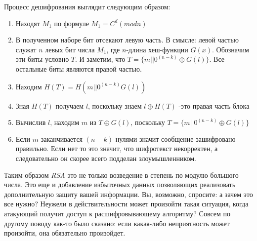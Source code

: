   Процесс дешифрования выглядит следующим образом:
    \begin{enumerate}
	    \item Находят {$M_1$} по формуле \textit{$ M_{1}=C^{d}(mod n) $}
	    \item В полученном наборе бит отсекают левую часть. В смысле: левой частью служат {$n$} левых бит числа {$M_1$}, где {$n$}-длина 
	      хеш-функции {$G(x)$}. Обозначим эти биты условно {$T$}. И заметим, что {$T= \{m||0^{(n-k)} \oplus G(l)\} $}. Все 
	      остальные биты являются правой частью.
	    \item Находим {$ H(T)=H(m||0^{(n-k)} G(l)) $}
	    \item Зная {$H(T)$} получаем {$l$}, поскольку знаем {$l \oplus H(T)$} -это правая часть блока
	    \item Вычислив {$l$}, находим {$m$} из {$T \oplus G(l)$}, поскольку {$ T=\{m||0^{(n-k)} \oplus G(l)\} $}
	    \item Если {$m$} заканчивается {$(n-k)$}-нулями значит сообщение зашифровано правильно. Если нет то это значит, что шифротекст 
	      некорректен, а следовательно он скорее всего подделан злоумышленником.
    \end{enumerate}

  Таким образом \textit{RSA} это не только возведение в степень по модулю большого числа. Это еще и добавление избыточных данных позволяющих реализовать 
  дополнительную защиту вашей информации. Вы, возможно, спросите: а зачем это все нужно? Неужели в действительности может произойти такая ситуация, когда 
  атакующий получит доступ к расшифровывающему алгоритму? Совсем по другому поводу как-то было сказано: если какая-либо неприятность может произойти, она 
  обязательно произойдет.